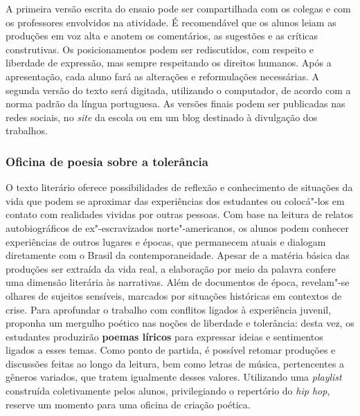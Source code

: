 \documentclass[12pt]{extarticle}
\begin{document}


A primeira versão escrita do ensaio pode ser compartilhada com os
colegas e com os professores envolvidos na atividade. É recomendável que
os alunos leiam as produções em voz alta e anotem os comentários, as
sugestões e as críticas construtivas. Os posicionamentos podem ser
rediscutidos, com respeito e liberdade de expressão, mas sempre
respeitando os direitos humanos. Após a apresentação, cada aluno fará as
alterações e reformulações necessárias. A segunda versão do texto será
digitada, utilizando o computador, de acordo com a norma padrão da
língua portuguesa. As versões finais podem ser publicadas nas redes
sociais, no \emph{site} da escola ou em um blog destinado à divulgação
dos trabalhos.

\subsubsection{Oficina de poesia sobre a tolerância}


O texto literário oferece possibilidades de reflexão e conhecimento de
situações da vida que podem se aproximar das experiências dos
estudantes ou colocá"-los em contato com realidades vividas por outras
pessoas. Com base na leitura de relatos autobiográficos de
ex"-escravizados norte"-americanos, os alunos podem conhecer
experiências de outros lugares e épocas, que permanecem atuais e
dialogam diretamente com o Brasil da contemporaneidade. Apesar de a
matéria básica das produções ser extraída da vida real, a elaboração
por meio da palavra confere uma dimensão literária às narrativas. Além
de documentos de época, revelam"-se olhares de sujeitos sensíveis,
marcados por situações históricas em contextos de crise. Para
aprofundar o trabalho com conflitos ligados à experiência juvenil,
proponha um mergulho poético nas noções de liberdade e tolerância:
desta vez, os estudantes produzirão \textbf{poemas líricos} para
expressar ideias e sentimentos ligados a esses temas. Como ponto de
partida, é possível retomar produções e discussões feitas ao longo da
leitura, bem como letras de música, pertencentes a gêneros variados,
que tratem igualmente desses valores. Utilizando uma \emph{playlist}
construída coletivamente pelos alunos, privilegiando o repertório do
\emph{hip hop}, reserve um momento para uma oficina de criação
poética. 
\end{document}
